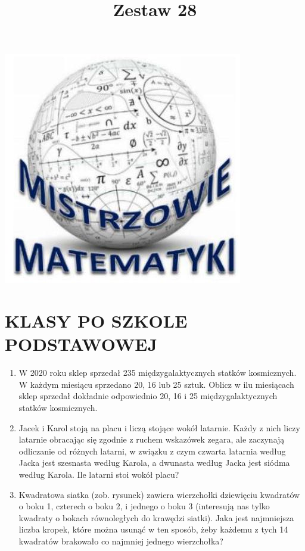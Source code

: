 \documentclass[10pt]{article}
\title{Zestaw 28 }
\author{}
\date{}
\begin{document}
\maketitle
\begin{center}
\includegraphics[max width=\textwidth]{2024_11_21_15e86d729faeca9d82b3g-1}
\end{center}

\section*{KLASY PO SZKOLE PODSTAWOWEJ}
\begin{enumerate}
  \item W 2020 roku sklep sprzedał 235 międzygalaktycznych statków kosmicznych. W każdym miesiącu sprzedano 20, 16 lub 25 sztuk. Oblicz w ilu miesiącach sklep sprzedał dokładnie odpowiednio 20, 16 i 25 międzygalaktycznych statków kosmicznych.
  \item Jacek i Karol stoją na placu i liczą stojące wokół latarnie. Każdy z nich liczy latarnie obracając się zgodnie z ruchem wskazówek zegara, ale zaczynają odliczanie od różnych latarni, w związku z czym czwarta latarnia według Jacka jest szesnasta według Karola, a dwunasta według Jacka jest siódma według Karola. Ile latarni stoi wokół placu?
  \item Kwadratowa siatka (zob. rysunek) zawiera wierzchołki dziewięciu kwadratów o boku 1, czterech o boku 2, i jednego o boku 3 (interesują nas tylko kwadraty o bokach równoległych do krawędzi siatki). Jaka jest najmniejsza liczba kropek, które można usunąć w ten sposób, żeby każdemu z tych 14 kwadratów brakowało co najmniej jednego wierzchołka?
\end{enumerate}
\end{document}
